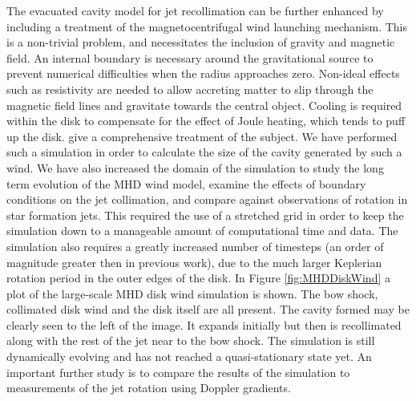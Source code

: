 The evacuated cavity model for jet recollimation can be further enhanced by
including a treatment of the magnetocentrifugal wind launching mechanism.
This is a non-trivial problem, and necessitates the inclusion of gravity and
magnetic field.
An internal boundary is necessary around the gravitational source to prevent
numerical difficulties when the radius approaches zero.
Non-ideal effects such as resistivity are needed to allow accreting matter to slip through the magnetic
field lines and gravitate towards the central object. 
Cooling is required within the disk to compensate for the effect of Joule
heating, which tends to puff up the disk.
\citet{2007astro.ph..3064Z} give a comprehensive treatment of the subject.
We have performed such a simulation in order to calculate the size of the cavity
generated by such a wind.
We have also increased the domain of the simulation to study the long term
evolution of the MHD wind model, examine the effects of boundary conditions on
the jet collimation, and compare against observations of rotation in star
formation jets. This required the use of a stretched grid in
order to keep the simulation down to a manageable amount of computational time
and data. 
The simulation also requires a greatly increased number of timesteps (an order of magnitude
greater then in previous work), due to the much larger Keplerian rotation
period in the outer edges of the disk.
In Figure \ref{fig:MHDDiskWind} a plot of the large-scale MHD disk wind simulation is shown.
The bow shock, collimated disk wind and the disk itself are all present.
The cavity formed may be clearly seen to the left of the image.
It expands initially but then is recollimated along with the rest of the jet
near to the bow shock.
The simulation is still dynamically evolving and has not reached a
quasi-stationary state yet.
An important further study is to compare the results of the simulation to measurements of the jet rotation using Doppler
gradients.

